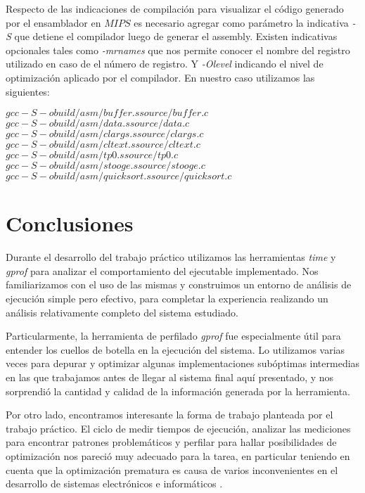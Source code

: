 \documentclass[a4paper,11pt]{article}
\begin{document}
Respecto de las indicaciones de compilación para visualizar el código generado por el
ensamblador en \(MIPS\) es necesario agregar como parámetro la indicativa \textit{-S} 
que detiene el compilador luego de generar el assembly.
Existen indicativas opcionales tales como \textit{-mrnames} que nos permite conocer
el nombre del registro utilizado en caso de el número de registro. Y \textit{-Olevel} 
indicando el nivel de optimización aplicado por el compilador.
En nuestro caso utilizamos las siguientes:

\(gcc -S -o build/asm/buffer.s source/buffer.c\)
\(gcc -S -o build/asm/data.s source/data.c\)
\(gcc -S -o build/asm/clargs.s source/clargs.c\)
\(gcc -S -o build/asm/cltext.s source/cltext.c\)
\(gcc -S -o build/asm/tp0.s source/tp0.c\)
\(gcc -S -o build/asm/stooge.s source/stooge.c\)
\(gcc -S -o build/asm/quicksort.s source/quicksort.c\)

\section{Conclusiones}

Durante el desarrollo del trabajo práctico utilizamos las herramientas
\textit{time} y \textit{gprof} para analizar el comportamiento del ejecutable
implementado. Nos familiarizamos con el uso de las mismas y construimos un
entorno de análisis de ejecución simple pero efectivo, para completar la
experiencia realizando un análisis relativamente completo del sistema
estudiado.

Particularmente, la herramienta de perfilado \textit{gprof} fue especialmente
útil para entender los cuellos de botella en la ejecución del sistema. Lo
utilizamos varias veces para depurar y optimizar algunas implementaciones
subóptimas intermedias en las que trabajamos antes de llegar al sistema final
aquí presentado, y nos sorprendió la cantidad y calidad de la información
generada por la herramienta.

Por otro lado, encontramos interesante la forma de trabajo planteada por el
trabajo práctico. El ciclo de medir tiempos de ejecución, analizar las
mediciones para encontrar patrones problemáticos y perfilar para hallar
posibilidades de optimización nos pareció muy adecuado para la tarea, en
particular teniendo en cuenta que la optimización prematura es causa de varios
inconvenientes en el desarrollo de sistemas electrónicos e informáticos
\cite{OPT}.
\end{document}
